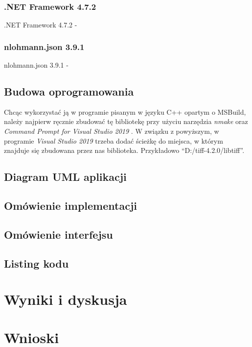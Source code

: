 \documentclass{article}
\begin{document}
        \subsubsection{.NET Framework 4.7.2}
        {
            \label{sec:.NETFramework 4.7.2}
            \Large
            \justifying
            \quad
            .NET Framework 4.7.2 - 
        }
        \subsubsection{nlohmann.json 3.9.1}
        {
            \label{sec:nlohman.json 3.9.1}
            \Large
            \justifying
            \quad
            nlohmann.json 3.9.1 - 
        }
        \subsection{Budowa oprogramowania}
        {
            \Large
            \justifying
            \quad
            Chcąc wykorzystać ją w programie pisanym w języku C++ opartym o MSBuild, należy najpierw ręcznie zbudować tę bibliotekę przy użyciu narzędzia \textit{nmake} oraz \textit{Command Prompt for Visual Studio 2019} \cite{Building LibTiff}.
            W związku z powyższym, w programie \textit{Visual Studio 2019} trzeba dodać ścieżkę do miejsca, w którym znajduje się zbudowana przez nas biblioteka.
            Przykładowo ``D:/tiff-4.2.0/libtiff''.
        }
        \subsection{Diagram UML aplikacji}
        \subsection{Omówienie implementacji}
        \subsection{Omówienie interfejsu}
        \subsection{Listing kodu}
    \newpage
    \section{Wyniki i dyskusja}
    \newpage
    \section{Wnioski}
    \newpage
\end{document}

